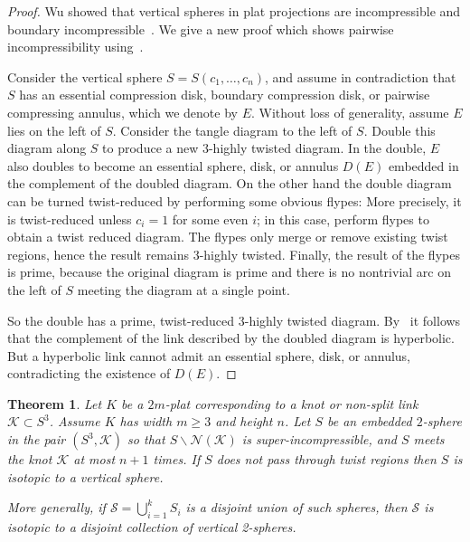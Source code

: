 \documentclass[12pt,reqno]{amsart}
\theoremstyle{plain}
\newtheorem{theorem}{Theorem}[section]
\theoremstyle{definition}
\newcommand{\NN}{\mathcal{N}}
\newcommand{\ssm}{\smallsetminus}
\begin{document}
\begin{proof}
Wu showed that vertical spheres in plat projections are incompressible 
and boundary incompressible~\cite[Theorem~1]{Wu}. We give a new proof 
which shows pairwise incompressibility using~\cite{LMP}. 

Consider the vertical sphere $S=S(c_1,\dots,c_n)$, and assume in contradiction 
that $S$ has an essential compression disk, boundary compression disk, or 
pairwise compressing annulus, which we denote by $E$. Without loss of 
generality, assume $E$ lies on the left of $S$. Consider the tangle 
diagram to the left of $S$. Double this diagram along $S$ to produce 
a new $3$-highly twisted diagram. In the double, $E$ also doubles to 
become an essential sphere, disk, or annulus $D(E)$ embedded in the 
complement of the doubled diagram. On the other hand the double diagram 
can be turned twist-reduced by performing some obvious flypes: More precisely, 
it is twist-reduced unless $c_i=1$ for some even $i$;
in this case, perform flypes to obtain a twist reduced diagram. 
The flypes only merge or remove existing twist regions, hence the 
result remains $3$-highly twisted. Finally, the result of the flypes 
is prime, because the original diagram is prime and there is no 
nontrivial arc on the left of $S$ meeting the diagram at a single point.  

So the double has a prime, twist-reduced $3$-highly twisted diagram. 
By~\cite[Theorem~A]{LMP} it follows that the complement of the link described 
by the doubled diagram is hyperbolic. But a hyperbolic link cannot admit an 
essential sphere, disk, or annulus, contradicting the existence of $D(E)$. 
\end{proof}

\begin{theorem}\label{thm:Verticalspheres}
Let $K$ be a $2m$-plat corresponding to a knot or non-split link
$\mathcal{K}\subset S^3$. Assume $K$ has width $m\geq 3$ and height $n$. 
Let $S$ be an embedded $2$-sphere in the pair $(S^3,\mathcal{K})$ 
so that $S \ssm \NN(\mathcal{K})$ is super-incompressible, and $S$ meets 
the knot $\mathcal{K}$ at most $n+1$ times. If $S$ does not pass through twist 
regions then $S$ is isotopic to a vertical sphere. 

More generally, if $\mathcal{S}= \bigcup_{i=1}^k S_i$ is a disjoint 
union of such spheres, then $\mathcal{S}$ is isotopic to a disjoint 
collection of vertical 2-spheres. 
\end{theorem}
\end{document}

